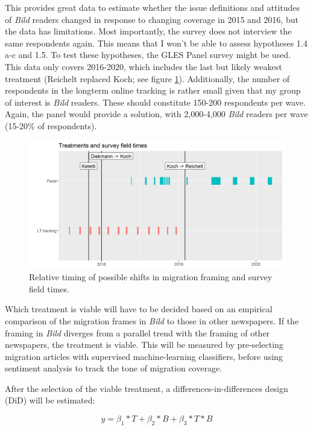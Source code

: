 \documentclass{article}
\begin{document}
This provides great data to estimate whether the issue definitions and attitudes of \textit{Bild} readers changed in response to changing coverage in 2015 and 2016, but the data has limitations. Most importantly, the survey does not interview the same respondents again. This means that I won't be able to assess hypotheses 1.4 a-c and 1.5. To test these hypotheses, the GLES Panel survey might be used. This data only covers 2016-2020, which includes the last but likely weakest treatment (Reichelt replaced Koch; see figure \ref{fig:gles}). Additionally, the number of respondents in the longterm online tracking is rather small given that my group of interest is \textit{Bild} readers. These should constitute 150-200 respondents per wave. Again, the panel would provide a solution, with 2,000-4,000 \textit{Bild} readers per wave (15-20\% of respondents).

\begin{figure}
    \centering
    \includegraphics[width=\textwidth]{gles_treatments.png}
    \caption{Relative timing of possible shifts in migration framing and survey field times.}
    \label{fig:gles}
\end{figure}

Which treatment is viable will have to be decided based on an empirical comparison of the migration frames in \textit{Bild} to those in other newspapers. If the framing in \textit{Bild} diverges from a parallel trend with the framing of other newspapers, the treatment is viable. This will be measured by pre-selecting migration articles with supervised machine-learning classifiers, before using sentiment analysis to track the tone of migration coverage. 

After the selection of the viable treatment, a differences-in-differences design (DiD) will be estimated:

$$ y = \beta_1 * T + \beta_2 * B + \beta_3 * T * B $$
\end{document}
